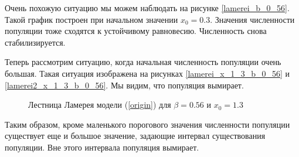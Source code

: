     Очень похожую ситуацию мы можем наблюдать на рисунке \ref{lamerei_b_0_56}. Такой график построен при начальном значении \(x_0 = 0.3\). Значения численности популяции тоже сходятся к устойчивому равновесию. Численность снова стабилизируется.
    
    Теперь рассмотрим ситуацию, когда начальная численность популяции очень большая. Такая ситуация изображена на рисунках \ref{lamerei_x_1_3_b_0_56} и \ref{lamerei2_x_1_3_b_0_56}. Мы видим, что популяция вымирает.

    \begin{figure}
        \centering

        \captionsetup{justification=centering}
        \caption{Лестница Ламерея модели (\ref{origin}) для \(\beta = 0.56\) и \(x_0 = 1.3\)}
    \end{figure}

    Таким образом, кроме маленького порогового значения численности популяции существует еще и большое значение, задающие интервал существования популяции. Вне этого интервала популяция вымирает. 
